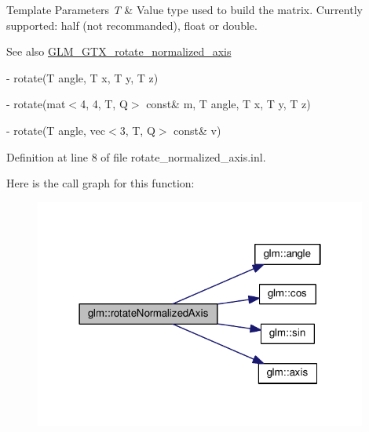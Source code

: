 \begin{DoxyTemplParams}{Template Parameters}
{\em T} & Value type used to build the matrix. Currently supported\+: half (not recommanded), float or double.\\
\hline
\end{DoxyTemplParams}
\begin{DoxySeeAlso}{See also}
\hyperlink{group__gtx__rotate__normalized__axis}{G\+L\+M\+\_\+\+G\+T\+X\+\_\+rotate\+\_\+normalized\+\_\+axis} 

-\/ rotate(\+T angle, T x, T y, T z) 

-\/ rotate(mat$<$4, 4, T, Q$>$ const\& m, T angle, T x, T y, T z) 

-\/ rotate(\+T angle, vec$<$3, T, Q$>$ const\& v) 
\end{DoxySeeAlso}


Definition at line 8 of file rotate\+\_\+normalized\+\_\+axis.\+inl.

Here is the call graph for this function\+:
\nopagebreak
\begin{figure}[H]
\begin{center}
\leavevmode
\includegraphics[width=310pt]{d4/de8/group__gtx__rotate__normalized__axis_ga50efd7ebca0f7a603bb3cc11e34c708d_cgraph}
\end{center}
\end{figure}
\mbox{\label{group__gtx__rotate__normalized__axis_gad5bb8a155ee52fd349b88cec3a843600}} 
